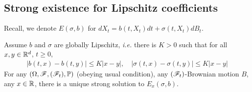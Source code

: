 \documentclass[12pt,a4paper]{article}
\begin{document}
\subsection{Strong existence for Lipschitz coefficients}

Recall, we denote $E(\sigma, b)$ for $dX_t = b(t, X_t) dt + \sigma(t, X_t) dB_t$.
\s

\thm Assume $b$ and $\sigma$ are globally Lipschitz, \textit{i.e.} there is $K>0$ such that for all $x,y\in \mathbb{R}^d$, $t\geq 0$,
\begin{align*}
|b(t, x)- b(t,y)| \leq K|x-y|, \quad |\sigma(t,x) - \sigma(t,y)| \leq K|x-y|
\end{align*}
For any $(\Omega, \mathscr{F}, (\mathscr{F}_t), \mathbb{P})$ (obeying usual condition), any $(\mathscr{F}_t)$-Brownian motion $B$, any $x\in \mathbb{R}$, there is a unique strong solution to $E_x(\sigma, b)$.
\end{document}
